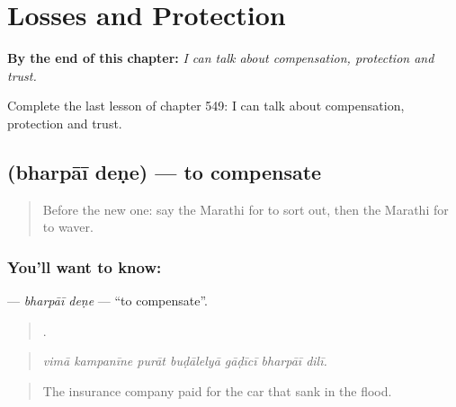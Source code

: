 
\chapter{Losses and Protection}
\label{ch:mr-losses-and-protection}

\begin{chapteropening}
\textbf{By the end of this chapter:} \emph{I can talk about compensation, protection and trust.}

Complete the last lesson of chapter 549: I can talk about compensation, protection and trust.
\end{chapteropening}

\section[\texorpdfstring{\mr{भरपाई} \mr{देणे} (bharpāī deṇe)}{भरपाई देणे (bharpāī deṇe)}]{  (bharpāī deṇe) — to compensate}

\label{lesson:MR-C549-bharpai-dene}



\begin{quote}
Before the new one: say the Marathi for to sort out, then the Marathi for to waver.
\end{quote}

\subsection*{You'll want to know:  }
\textbf{ } — \emph{bharpāī deṇe} — \textquotedblleft{}to compensate\textquotedblright{}.

\begin{quote}
      .
\end{quote}

\begin{quote}
\emph{vimā kampanīne purāt buḍālelyā gāḍīcī bharpāī dilī.}
\end{quote}

\begin{quote}
The insurance company paid for the car that sank in the flood.
\end{quote}


